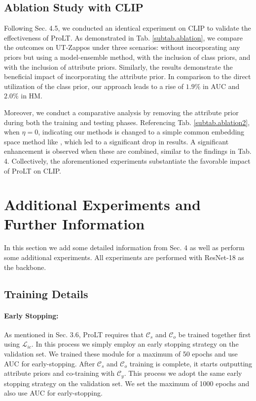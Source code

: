 \documentclass[letterpaper]{article} %
\theoremstyle{definition}
\begin{document}
\subsection{Ablation Study with CLIP}
Following Sec. 4.5, we conducted an identical experiment on CLIP to validate the effectiveness of ProLT. As demonstrated in Tab. \ref{subtab.ablation}, we compare the outcomes on UT-Zappos \cite{utzappos} under three scenarios: without incorporating any priors but using a model-ensemble method, with the inclusion of class priors, and with the inclusion of attribute priors. Similarly, the results demonstrate the beneficial impact of incorporating the attribute prior. In comparison to the direct utilization of the class prior, our approach leads to a rise of $1.9\%$ in AUC and $2.0\%$ in HM.

Moreover, we conduct a comparative analysis by removing the attribute prior during both the training and testing phases. Referencing Tab. \ref{subtab.ablation2}, when $\eta=0$, indicating our methods is changed to a simple common embedding space method like \citet{naeem2021learning}, which led to a significant drop in results. A significant enhancement is observed when these are combined, similar to the findings in Tab. 4. Collectively, the aforementioned experiments substantiate the favorable impact of ProLT on CLIP.

\section{Additional Experiments and Further Information}
In this section we add some detailed information from Sec. 4 as well as perform some additional experiments. All experiments are performed with ResNet-18 \cite{resnet} as the backbone.
\subsection{Training Details}
\paragraph{Early Stopping:}
As mentioned in Sec. 3.6, ProLT requires that $\mathcal{C}_{s}$ and $\mathcal{C}_{o}$ be trained together first using $\mathcal{L}_{ic}$. In this process we simply employ an early stopping strategy on the validation set. We trained these module for a maximum of 50 epochs and use AUC for early-stopping. After $\mathcal{C}_{s}$ and $\mathcal{C}_{o}$ training is complete, it starts outputting attribute priors and co-training with $\mathcal{C}_y$. This process we adopt the same early stopping strategy on the validation set. We set the maximum of 1000 epochs and also use AUC for early-stopping.
\end{document}
